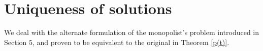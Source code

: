 \documentclass[12pt,reqno]{amsart}
\begin{document}

\section{Uniqueness of solutions}\label{uniqueness}
We deal with the alternate formulation of the monopolist's problem introduced in Section 5, and proven to be equivalent to the original in Theorem \ref{p(t)}.
\end{document}
